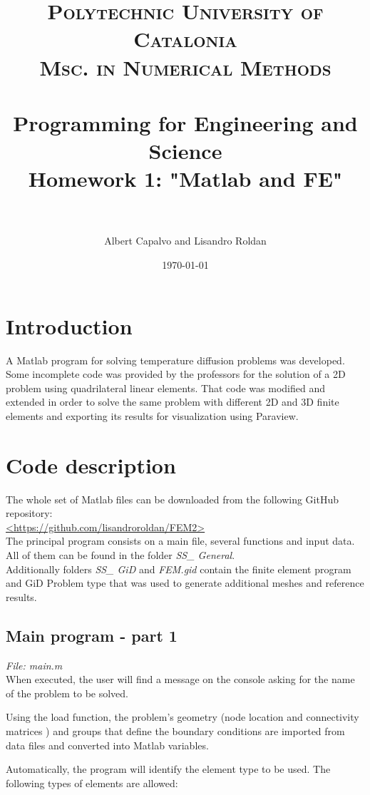 \documentclass[paper=a4, fontsize=11pt]{article} %
\title{	
\normalfont \normalsize 
\textsc{Polytechnic University of Catalonia} \\ [10pt]
\textsc{\small{ Msc. in Numerical Methods }} \\ [25pt]
\horrule{0.3pt} \\[0.2cm] %
\LARGE  \textbf{Programming for Engineering and Science} \\ Homework 1: "Matlab and FE" \\ %
\horrule{0.3pt} \\[0.1cm] %
}
\author{Albert Capalvo and Lisandro Roldan} %
\date{\normalsize\today} %
\numberwithin{equation}{section} %
\numberwithin{figure}{section} %
\numberwithin{table}{section} %
\begin{document}
\maketitle

\section{\textbf{Introduction}}

A Matlab program for solving temperature diffusion problems was developed. Some incomplete code was provided by the professors for the solution of a 2D problem using quadrilateral linear elements. That code was modified and extended in order to solve the same problem with different 2D and 3D finite elements and exporting its results for visualization using Paraview.

\section{\textbf{Code description}}

The whole set of Matlab files can be downloaded from the following GitHub repository: \\
\url{<https://github.com/lisandroroldan/FEM2>}\\
The principal program consists on a main file, several functions and input data. All of them can be found in the folder \textit{SS\_ General}.\\
Additionally folders \textit{SS\_ GiD} and \textit{FEM.gid} contain the finite element program and GiD Problem type that was used to generate additional meshes and reference results.

\subsection{\textbf{Main program - part 1}}
\textit{File: main.m}\\

When executed, the user will find a message on the console asking for the name of the problem to be solved. 

Using the load function, the problem's geometry (node location and connectivity matrices ) and groups that define the boundary conditions are imported from data files and converted into Matlab variables.

Automatically, the program will identify the element type to be used. The following types of elements are allowed:\\
\end{document}

